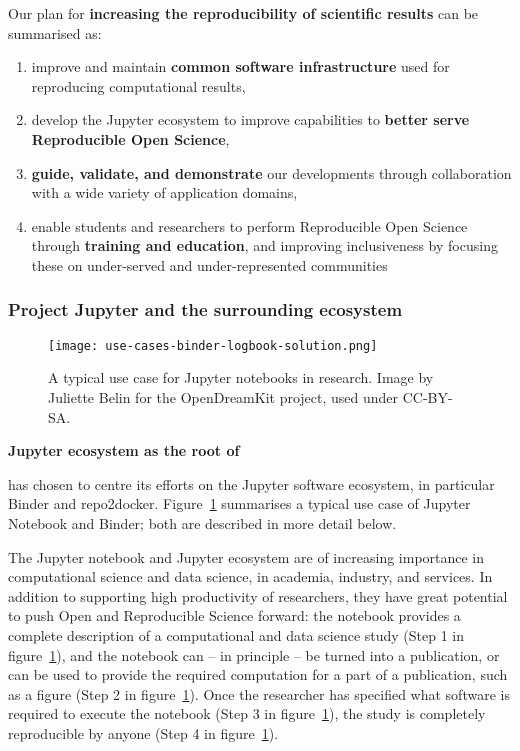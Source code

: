 \noindent Our plan for \textbf{increasing the reproducibility of scientific results} can be summarised as:

\begin{enumerate}
\item improve and maintain \textbf{common software infrastructure} used for
  reproducing computational results,
\item develop the Jupyter ecosystem to improve capabilities to \textbf{better
  serve Reproducible Open Science},
\item \textbf{guide, validate, and demonstrate} our developments through
  collaboration with a wide variety of application domains,
\item enable students and researchers to perform Reproducible Open Science through
  \textbf{training and education}, and improving inclusiveness by focusing
  these on under-served and under-represented communities
\end{enumerate}

\medskip

\subsubsection{Project Jupyter and the surrounding ecosystem}
\label{sec:project-jupyter}

\begin{figure}[htb]\centering
  \texttt{[image: use-cases-binder-logbook-solution.png]}
  \caption{A typical use case for Jupyter notebooks in research.
            Image by Juliette Belin for the OpenDreamKit project, used under
            CC-BY-SA.}\label{fig:use-cases-binder}
\end{figure}

\noindent\textbf{Jupyter ecosystem as the root of \TheProject}


\TheProject has chosen to centre its efforts on the Jupyter software
ecosystem, in particular Binder and repo2docker.
Figure~\ref{fig:use-cases-binder} summarises a typical use
case of Jupyter Notebook and Binder;
both are described in more detail below.

The Jupyter notebook and Jupyter ecosystem are of increasing
importance in computational science and data science, in academia,
industry, and services. In addition to supporting high productivity of
researchers, they have great potential to push Open and Reproducible Science forward:
the notebook provides a complete description of a computational and
data science study (Step 1 in figure~\ref{fig:use-cases-binder}), and the notebook can -- in principle -- be turned
into a publication, or can be used to provide the required computation
for a part of a publication, such as a figure
(Step 2 in figure~\ref{fig:use-cases-binder}). Once the researcher has
specified what software is required to execute the notebook (Step 3
in figure~\ref{fig:use-cases-binder}), the study is completely
reproducible by anyone (Step 4 in figure~\ref{fig:use-cases-binder}).

